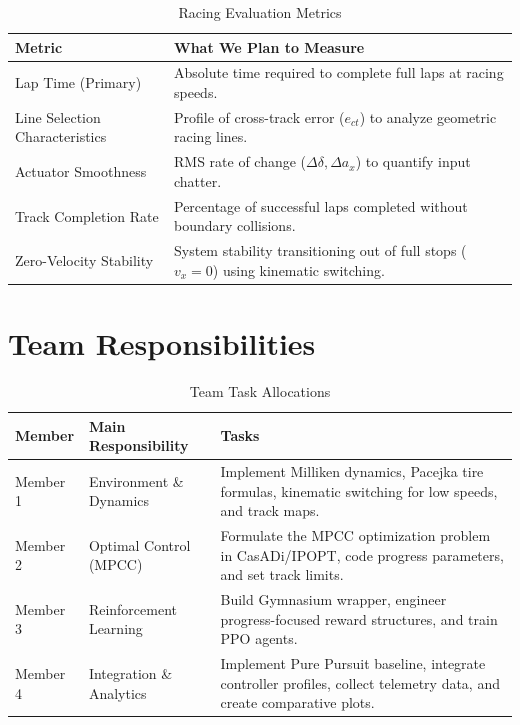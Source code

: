 \documentclass[12pt]{article}
\begin{document}
\begin{table}[h!]
\centering
\small
\begin{tabular}{lp{10cm}}
\toprule
\textbf{Metric} & \textbf{What We Plan to Measure} \\ \midrule
Lap Time (Primary) & Absolute time required to complete full laps at racing speeds. \\ \addlinespace
Line Selection Characteristics & Profile of cross-track error ($e_{ct}$) to analyze geometric racing lines. \\ \addlinespace
Actuator Smoothness & RMS rate of change ($\Delta\delta, \Delta a_x$) to quantify input chatter. \\ \addlinespace
Track Completion Rate & Percentage of successful laps completed without boundary collisions. \\ \addlinespace
Zero-Velocity Stability & System stability transitioning out of full stops ($v_x = 0$) using kinematic switching. \\ \bottomrule
\end{tabular}
\caption{Racing Evaluation Metrics}
\end{table}

\section{Team Responsibilities}
\begin{table}[h!]
\centering
\small
\begin{tabular}{llp{7.5cm}}
\toprule
\textbf{Member} & \textbf{Main Responsibility} & \textbf{Tasks} \\ \midrule
Member 1 & Environment \& Dynamics & Implement Milliken dynamics, Pacejka tire formulas, kinematic switching for low speeds, and track maps. \\ \addlinespace
Member 2 & Optimal Control (MPCC) & Formulate the MPCC optimization problem in CasADi/IPOPT, code progress parameters, and set track limits. \\ \addlinespace
Member 3 & Reinforcement Learning & Build Gymnasium wrapper, engineer progress-focused reward structures, and train PPO agents. \\ \addlinespace
Member 4 & Integration \& Analytics & Implement Pure Pursuit baseline, integrate controller profiles, collect telemetry data, and create comparative plots. \\ \bottomrule
\end{tabular}
\caption{Team Task Allocations}
\end{table}
\end{document}
